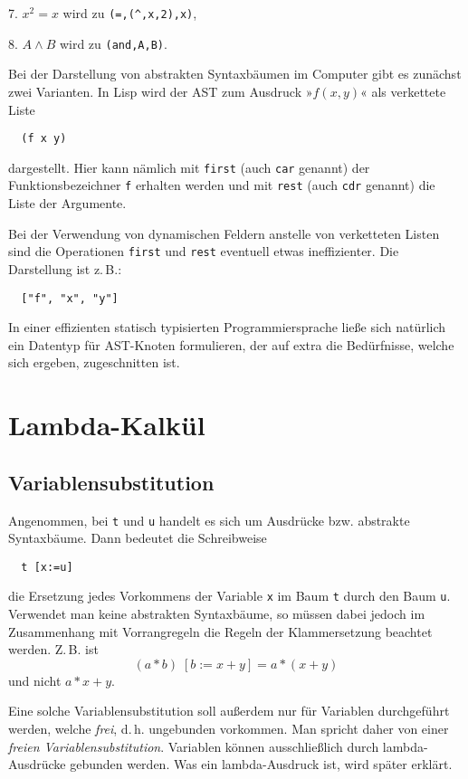 \documentclass[a4paper,11pt,fleqn,twocolumn,twoside]{article}
\numberwithin{equation}{section}
\begin{document}
7. $x^2=x$ wird zu \verb|(=,(^,x,2),x)|,

8. $A\land B$ wird zu \verb|(and,A,B)|.

\noindent
Bei der Darstellung von abstrakten Syntaxbäumen im Computer gibt
es zunächst zwei Varianten. In Lisp wird der AST zum Ausdruck »$f(x,y)$«
als verkettete Liste
\begin{verbatim}
  (f x y)
\end{verbatim}
dargestellt. Hier kann nämlich mit \texttt{first}
(auch \texttt{car} genannt) der Funktionsbezeichner \texttt{f}
erhalten werden und mit \texttt{rest} (auch \texttt{cdr} genannt)
die Liste der Argumente.

Bei der Verwendung von dynamischen Feldern anstelle von verketteten
Listen sind die Operationen \texttt{first} und \texttt{rest} eventuell
etwas ineffizienter. Die Darstellung ist z.\,B.:
\begin{verbatim}
  ["f", "x", "y"]
\end{verbatim}
In einer effizienten statisch typisierten
Programmiersprache ließe sich natürlich ein Datentyp für AST-Knoten
formulieren, der auf extra die Bedürfnisse, welche sich ergeben,
zugeschnitten ist.

\section{Lambda-Kalkül}
\subsection{Variablensubstitution}
Angenommen, bei \texttt{t} und \texttt{u} handelt es sich um Ausdrücke
bzw. abstrakte Syntaxbäume. Dann bedeutet die Schreibweise
\begin{verbatim}
  t [x:=u]
\end{verbatim}
die Ersetzung jedes Vorkommens der Variable \texttt{x} im Baum
\texttt{t} durch den Baum \texttt{u}. Verwendet man keine abstrakten
Syntaxbäume, so müssen dabei jedoch im Zusammenhang mit Vorrangregeln
die Regeln der Klammersetzung beachtet werden. Z.\,B. ist
\begin{equation}
  (a*b)\;[b:=x+y] = a*(x+y)
\end{equation}
und nicht $a*x+y$.

Eine solche Variablensubstitution soll außerdem nur für
Variablen durchgeführt werden, welche \emph{frei}, d.\,h. ungebunden
vorkommen. Man spricht daher von einer
\emph{freien Variablensubstitution}. Variablen können ausschließlich
durch lambda-Ausdrücke gebunden werden. Was ein lambda-Ausdruck ist,
wird später erklärt.
\end{document}

